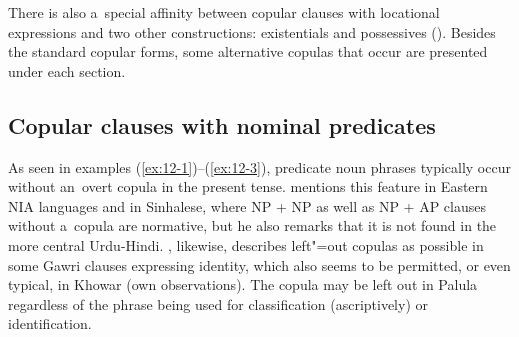 

There is also a~special affinity between copular clauses with locational expressions and two other constructions: existentials and possessives (). Besides the standard copular forms, some alternative copulas that occur are presented under each section.


\subsection{Copular clauses with nominal predicates}
\label{subsec:12-1-1}


As seen in examples (\ref{ex:12-1})--(\ref{ex:12-3}), predicate noun phrases typically occur without an~overt copula in the present tense. \citet[337]{masica1991} mentions this feature in Eastern NIA languages and in Sinhalese, where NP + NP as well as NP + AP clauses without a~copula are normative, but he also remarks that it is not found in the more central Urdu-Hindi. \citet[118--122]{baart1999a}, likewise, describes left"=out copulas as possible in some Gawri clauses expressing identity, which also seems to be permitted, or even typical, in Khowar (own observations). The copula may be left out in Palula regardless of the phrase being used for classification (ascriptively) or identification. 

